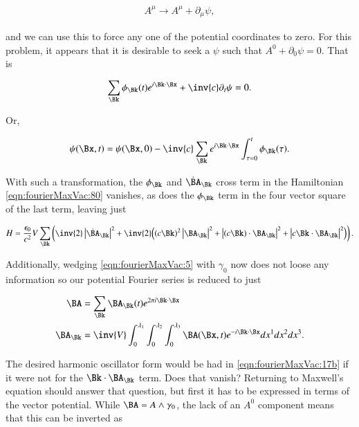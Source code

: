 \begin{align}\label{eqn:fourierMaxVac:31}
A^\mu \rightarrow A^\mu + \partial_\mu \psi,
\end{align}

and we can use this to force any one of the potential coordinates to zero.  For this problem, it appears that it is desirable to seek a $\psi$ such that $A^0 + \partial_0 \psi = 0$.  That is

\begin{align}\label{eqn:fourierMaxVac:32}
\sum_\Bk \phi_\Bk(t) e^{i \Bk \cdot \Bx} + \inv{c} \partial_t \psi = 0.
\end{align}

Or,

\begin{align}\label{eqn:fourierMaxVac:33}
\psi(\Bx,t) = \psi(\Bx,0) -\inv{c} \sum_\Bk e^{i \Bk \cdot \Bx} \int_{\tau=0}^t \phi_\Bk(\tau).
\end{align}

With such a transformation, the $\phi_\Bk$ and $\dot{\BA}_\Bk$ cross term in the Hamiltonian \autoref{eqn:fourierMaxVac:80} vanishes, as does the $\phi_\Bk$ term in the four vector square of the last term, leaving just

\begin{align}
\label{eqn:fourierMaxVac:17b}
H = 
\frac{\epsilon_0}{c^2} V \sum_\Bk
\left(
\inv{2} \Abs{\dot{\BA}_\Bk}^2
+
\inv{2} \Bigl(
(c \Bk)^2 \Abs{\BA_\Bk}^2 + \Abs{ ( c \Bk) \cdot \BA_\Bk}^2
+ \Abs{ c \Bk \cdot \BA_\Bk}^2
\Bigr)
\right).
\end{align}

Additionally, wedging \autoref{eqn:fourierMaxVac:5} with $\gamma_0$ now does not loose any information so our potential Fourier series is reduced to just

\begin{subequations}
\label{eqn:fourierMaxVac:5b}
\begin{align}
\BA &= \sum_{\Bk} \BA_\Bk(t) e^{2 \pi i \Bk \cdot \Bx} \\
\BA_\Bk &= 
\inv{ V }
\int_0^{\lambda_1}
\int_0^{\lambda_2}
\int_0^{\lambda_3} \BA(\Bx, t) e^{-i \Bk \cdot \Bx} dx^1 dx^2 dx^3.
\end{align}
\end{subequations}

The desired harmonic oscillator form would be had in \autoref{eqn:fourierMaxVac:17b} if it were not for the $\Bk \cdot \BA_\Bk$ term.  Does that vanish?  Returning to Maxwell's equation should answer that question, but first it has to be expressed in terms of the vector potential.  While $\BA = A \wedge \gamma_0$, the lack of an $A^0$ component means that this can be inverted as

